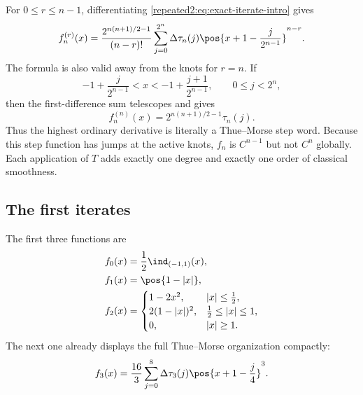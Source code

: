\documentclass[11pt,oneside]{article}
\theoremstyle{definition}
\theoremstyle{remark}
\begin{document}
For $0\le r\le n-1$, differentiating \eqref{repeated2:eq:exact-iterate-intro} gives
\begin{equation}
 f_n^{(r)}(x)=
 \frac{2^{n(n+1)/2-1}}{(n-r)!}
 \sum_{j=0}^{2^n}\Delta\tau_n(j)
 \pos{x+1-\frac{j}{2^{n-1}}}^{n-r}.
 \label{repeated2:eq:finite-spline-derivatives}
\end{equation}
The formula is also valid away from the knots for $r=n$.  If
\begin{equation}
 -1+\frac{j}{2^{n-1}}<x<-1+\frac{j+1}{2^{n-1}},
 \qquad 0\le j<2^n,
 \label{repeated2:eq:open-cell}
\end{equation}
then the first-difference sum telescopes and gives
\begin{equation}
 \boxed{\displaystyle
 f_n^{(n)}(x)=2^{n(n+1)/2-1}\tau_n(j).}
 \label{repeated2:eq:top-derivative-thue-morse}
\end{equation}
Thus the highest ordinary derivative is literally a Thue--Morse step word.  Because this
step function has jumps at the active knots, $f_n$ is $C^{n-1}$ but not $C^n$ globally.  Each
application of $T$ adds exactly one degree and exactly one order of classical smoothness.

\subsection{The first iterates}

The first three functions are
\begin{align}
 f_0(x)&=\frac12\ind_{(-1,1)}(x),
 \label{repeated2:eq:f0-explicit}\\
 f_1(x)&=\pos{1-|x|},
 \label{repeated2:eq:f1-explicit}\\
 f_2(x)&=
 \begin{cases}
 1-2x^2,&|x|\le\tfrac12,\\
 2(1-|x|)^2,&\tfrac12\le|x|\le1,\\
 0,&|x|\ge1.
 \end{cases}
 \label{repeated2:eq:f2-explicit}
\end{align}
The next one already displays the full Thue--Morse organization compactly:
\begin{equation}
 f_3(x)=\frac{16}{3}\sum_{j=0}^{8}\Delta\tau_3(j)
 \pos{x+1-\frac j4}^{3}.
 \label{repeated2:eq:f3-truncated-power}
\end{equation}
\end{document}
